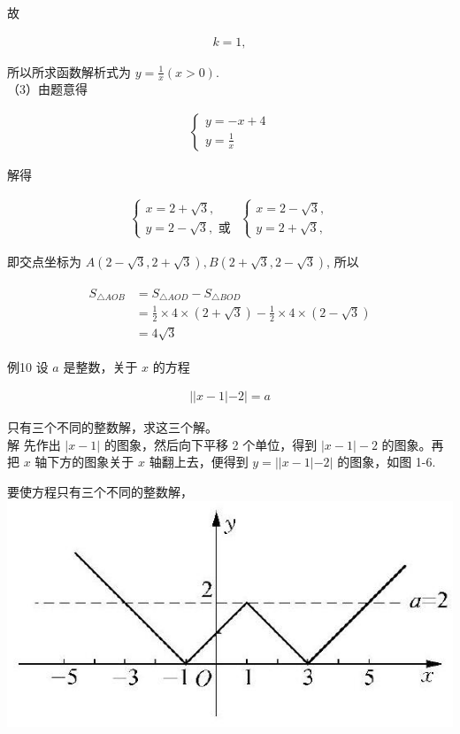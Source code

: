 \documentclass[10pt]{article}
\begin{document}
故

\begin{align*}
k=1,
\end{align*}

所以所求函数解析式为 $y=\frac{1}{x}(x>0)$.\\
（3）由题意得

\begin{align*}
\left\{\begin{array}{l}
y=-x+4 \\
y=\frac{1}{x}
\end{array}\right.
\end{align*}

解得

\begin{align*}
\left\{\begin{array} { l } 
{ x = 2 + \sqrt { 3 } , } \\
{ y = 2 - \sqrt { 3 } , \text { 或 } }
\end{array} \left\{\begin{array}{l}
x=2-\sqrt{3}, \\
y=2+\sqrt{3},
\end{array}\right.\right.
\end{align*}

即交点坐标为 $A(2-\sqrt{3}, 2+\sqrt{3}), B(2+\sqrt{3}, 2-\sqrt{3})$, 所以

\begin{align*}
\begin{aligned}
S_{\triangle A O B} & =S_{\triangle A O D}-S_{\triangle B O D} \\
& =\frac{1}{2} \times 4 \times(2+\sqrt{3})-\frac{1}{2} \times 4 \times(2-\sqrt{3}) \\
& =4 \sqrt{3}
\end{aligned}
\end{align*}

例10 设 $a$ 是整数，关于 $x$ 的方程

\begin{align*}
||x-1|-2|=a
\end{align*}

只有三个不同的整数解，求这三个解。\\
解 先作出 $|x-1|$ 的图象，然后向下平移 2 个单位，得到 $|x-1|-2$ 的图象。再把 $x$ 轴下方的图象关于 $x$ 轴翻上去，便得到 $y=||x-1|-2|$ 的图象，如图 1-6.

要使方程只有三个不同的整数解，\\
\includegraphics[max width=\textwidth, center]{2024_10_30_1bf34f7aeb61f11d11d3g-017}
\end{document}
